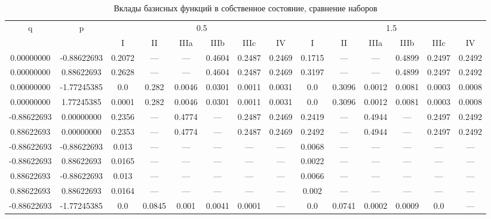 \documentclass[a4paper,14pt]{extarticle}
\begin{document}
\begin{landscape}
\begin{table}[H]
\centering
\caption{Вклады базисных функций в собственное состояние, сравнение наборов}
\begin{tabular}{|c|c|*{6}{c}|*{6}{c}|}
\hline
\multirow{2}{*}{q} & \multirow{2}{*}{p} & \multicolumn{6}{|c|}{0.5}                           & \multicolumn{6}{|c|}{1.5}                           \\
\cline{3-14}
                   &                    & I      & II     & IIIa   & IIIb   & IIIc   & IV     & I      & II     & IIIa   & IIIb   & IIIc   & IV     \\ 
\hline
 0.00000000        & -0.88622693        & 0.2072 & ---    & ---    & 0.4604 & 0.2487 & 0.2469 & 0.1715 & ---    & ---    & 0.4899 & 0.2497 & 0.2492 \\ 
 0.00000000        &  0.88622693        & 0.2628 & ---    & ---    & 0.4604 & 0.2487 & 0.2469 & 0.3197 & ---    & ---    & 0.4899 & 0.2497 & 0.2492 \\ 
 0.00000000        & -1.77245385        & 0.0    & 0.282  & 0.0046 & 0.0301 & 0.0011 & 0.0031 & 0.0    & 0.3096 & 0.0012 & 0.0081 & 0.0003 & 0.0008 \\ 
 0.00000000        &  1.77245385        & 0.0001 & 0.282  & 0.0046 & 0.0301 & 0.0011 & 0.0031 & 0.0    & 0.3096 & 0.0012 & 0.0081 & 0.0003 & 0.0008 \\ 
-0.88622693        &  0.00000000        & 0.2356 & ---    & 0.4774 & ---    & 0.2487 & 0.2469 & 0.2419 & ---    & 0.4944 & ---    & 0.2497 & 0.2492 \\  
 0.88622693        &  0.00000000        & 0.2353 & ---    & 0.4774 & ---    & 0.2487 & 0.2469 & 0.2492 & ---    & 0.4944 & ---    & 0.2497 & 0.2492 \\ 
-0.88622693        & -0.88622693        & 0.013  & ---    & ---    & ---    & ---    & ---    & 0.0068 & ---    & ---    & ---    & ---    & ---    \\  
-0.88622693        &  0.88622693        & 0.0165 & ---    & ---    & ---    & ---    & ---    & 0.0022 & ---    & ---    & ---    & ---    & ---    \\ 
 0.88622693        & -0.88622693        & 0.013  & ---    & ---    & ---    & ---    & ---    & 0.0066 & ---    & ---    & ---    & ---    & ---    \\ 
 0.88622693        &  0.88622693        & 0.0164 & ---    & ---    & ---    & ---    & ---    & 0.002  & ---    & ---    & ---    & ---    & ---    \\ 
-0.88622693        & -1.77245385        & 0.0    & 0.0845 & 0.001  & 0.0041 & 0.0001 & ---    & 0.0    & 0.0741 & 0.0002 & 0.0009 & 0.0    & ---    \\ 

\end{tabular}
\end{table}
\end{landscape}
\end{document}
